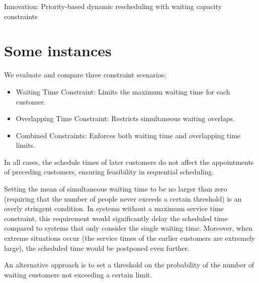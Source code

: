 \documentclass{article}
\begin{document}
Innovation: Priority-based dynamic rescheduling with waiting capacity constraints

\section{Some instances}
We evaluate and compare three constraint scenarios: 

\begin{itemize}
    \item  Waiting Time Constraint: Limits the maximum waiting time for each customer.
    \item  Overlapping Time Constraint: Restricts simultaneous waiting overlaps.
    \item  Combined Constraints: Enforces both waiting time and overlapping time limits.
\end{itemize}

In all cases, the schedule times of later customers do not affect the appointments of preceding customers, ensuring feasibility in sequential scheduling.

Setting the mean of simultaneous waiting time to be no larger than zero (requiring that the number of people never exceeds a certain threshold) is an overly stringent condition. In systems without a maximum service time constraint, this requirement would significantly delay the scheduled time compared to systems that only consider the single waiting time. Moreover, when extreme situations occur (the service times of the earlier customers are extremely large), the scheduled time would be postponed even further.


An alternative approach is to set a threshold on the probability of the number of waiting customers not exceeding a certain limit.


  
  
  


\end{document}
